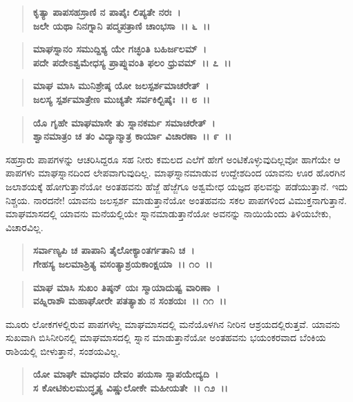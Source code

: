 \begin{verse}
\textbf{ಕೃತ್ಯಾ ಪಾಪಸಹಸ್ರಾಣಿ ನ ಪಾಪೈಃ ಲಿಪ್ಯತೇ ನರಃ~।}\\\textbf{ಜಲೇ ಯಥಾ ನಿನಗ್ನಾನಿ ಪದ್ಮಪತ್ರಾಣಿ ಚಾಂಭಸಾ~।। ೬~।। }
\end{verse}

\begin{verse}
\textbf{ಮಾಘಸ್ನಾನಂ ಸಮುದ್ದಿಶ್ಯ ಯೇ ಗಚ್ಛಂತಿ ಬಹಿರ್ಜಲಮ್~।}\\\textbf{ಪದೇ ಪದೇಽಶ್ವಮೇಧಸ್ಯ ಪ್ರಾಪ್ನುವಂತಿ ಫಲಂ ಧ್ರುವಮ್~।। ೭~।। }
\end{verse}

\begin{verse}
\textbf{ಮಾಘ ಮಾಸಿ ಮುನಿಶ್ರೇಷ್ಠ ಯೋ ಜಲಸ್ಪರ್ಶಮಾಚರೇತ್~।}\\\textbf{ಜಲಸ್ಯ ಸ್ಪರ್ಶಮಾತ್ರೇಣ ಮುಚ್ಯತೇ ಸರ್ವಕಿಲ್ಬಿಷೈಃ~।। ೮~।। }
\end{verse}

\begin{verse}
\textbf{ಯೊ ಗೃಹೇ ಮಾಘಮಾಸೇ ತು ಸ್ನಾನಕರ್ಮ ಸಮಾಚರೇತ್~।}\\\textbf{ಶ್ವಾನಮಾತ್ರಂ ಚ ತಂ ವಿದ್ಯಾನ್ಮಾತ್ರ ಕಾರ್ಯಾ ವಿಚಾರಣಾ~।। ೯~।।}
\end{verse}

ಸಹಸ್ರಾರು ಪಾಪಗಳನ್ನು ಆಚರಿಸಿದ್ದರೂ ಸಹ ನೀರು ಕಮಲದ ಎಲೆಗೆ ಹೇಗೆ ಅಂಟಿಕೊಳ್ಳುವುದಿಲ್ಲವೋ ಹಾಗೆಯೇ ಆ ಪಾಪಗಳು ಮಾಘಸ್ನಾನದಿಂದ ಲೇಪವಾಗುವುದಿಲ್ಲ. ಮಾಘಸ್ನಾನ\-ಮಾಡುವ ಉದ್ದೇಶದಿಂದ ಯಾವನು ಊರ ಹೊರಗಿನ ಜಲಾಶಯಕ್ಕೆ ಹೋಗುತ್ತಾನೆಯೋ ಅಂತಹವನು ಹೆಜ್ಜೆ ಹೆಜ್ಜೆಗೂ ಅಶ್ವಮೇಧ ಯಜ್ಞದ ಫಲವನ್ನು ಪಡೆಯುತ್ತಾನೆ. ಇದು ನಿಶ್ಚಯ. ನಾರದನೇ! ಯಾವನು ಜಲಸ್ಪರ್ಶ ಮಾಡುತ್ತಾನೆಯೋ ಅಂತಹವನು ಸಕಲ ಪಾಪಗಳಿಂದ ವಿಮುಕ್ತನಾಗುತ್ತಾನೆ. ಮಾಘಮಾಸದಲ್ಲಿ ಯಾವನು ಮನೆಯಲ್ಲಿಯೇ ಸ್ನಾನಮಾಡುತ್ತಾನೆಯೋ ಅವನನ್ನು ನಾಯಿಯೆಂದು ತಿಳಿಯಬೇಕು, ವಿಚಾರವಿಲ್ಲ.

\begin{verse}
\textbf{ಸರ್ವಾಣ್ಯಪಿ ಚ ಪಾಪಾನಿ ತೈಲೋಕ್ಯಾಂತರ್ಗತಾನಿ ಚ~।}\\\textbf{ಗೇಹಸ್ಯ ಜಲಮಾಶ್ರಿತ್ಯ ವಸಂತ್ಯಾಶ್ರಯಕಾಂಕ್ಷಯಾ~।। ೧೦~।।}
\end{verse}

\begin{verse}
\textbf{ಮಾಘ ಮಾಸಿ ಸುಖಂ ತಿಷ್ಠನ್ ಯಃ ಸ್ಮಾಯಾದುಷ್ಟ ವಾರಿಣಾ~।}\\\textbf{ವಹ್ನಿರಾಶೌ ಮಹಾಘೋರೇ ಪತತ್ಯಾಶು ನ ಸಂಶಯಃ~।। ೧೧~।।}
\end{verse}

ಮೂರು ಲೋಕಗಳಲ್ಲಿರುವ ಪಾಪಗಳೆಲ್ಲ ಮಾಘಮಾಸದಲ್ಲಿ ಮನೆಯೊಳಗಿನ ನೀರಿನ ಆಶ್ರಯದಲ್ಲಿರುತ್ತವೆ. ಯಾವನು ಸುಖವಾಗಿ ಬಿಸಿನೀರಿನಲ್ಲಿ ಮಾಘಮಾಸದಲ್ಲಿ ಸ್ನಾನ ಮಾಡುತ್ತಾನೆಯೋ ಅಂತಹವನು ಭಯಂಕರವಾದ ಬೆಂಕಿಯ ರಾಶಿಯಲ್ಲಿ ಬೀಳುತ್ತಾನೆ, ಸಂಶಯವಿಲ್ಲ.

\begin{verse}
\textbf{ಯೋ ಮಾಘೇ ಮಾಧವಂ ದೇವಂ ಪಯಸಾ ಸ್ನಾಪಯೇದ್ಯದಿ~।}\\\textbf{ಸ ಕೋಟಿಕುಲಮುದ್ಧೃತ್ಯ ವಿಷ್ಣುಲೋಕೇ ಮಹೀಯತೇ~।। ೧೨~।। }
\end{verse}

